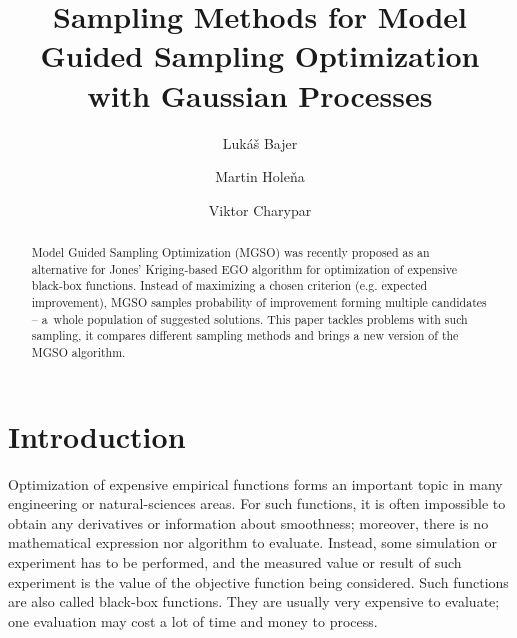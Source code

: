 \documentclass{itatnew}
\begin{document}
\title{Sampling Methods for Model Guided Sampling Optimization
  with Gaussian Processes}

\author{Lukáš Bajer \and Martin Holeňa \and Viktor Charypar }


\maketitle              %

\begin{abstract}
Model Guided Sampling Optimization (MGSO) was recently proposed as an alternative for Jones' Kriging-based EGO algorithm for optimization of expensive black-box functions. Instead of maximizing a chosen criterion (e.g. expected improvement), MGSO samples probability of improvement forming multiple candidates -- a~whole population of suggested solutions. This paper tackles problems with such sampling, it compares different sampling methods and brings a new version of the MGSO algorithm.
\end{abstract}

\section{Introduction}
%
Optimization of expensive empirical functions forms an important topic in many engineering or natural-sciences areas. For such functions, it is often impossible to obtain any derivatives or information about smoothness; moreover, there is no mathematical expression nor algorithm to evaluate. Instead, some simulation or experiment has to be performed, and the measured value or result of such experiment is the value of the objective function being considered. Such functions are also called black-box functions. 
They are usually very expensive to evaluate; one evaluation may cost a lot of time and money to process.
\end{document}
